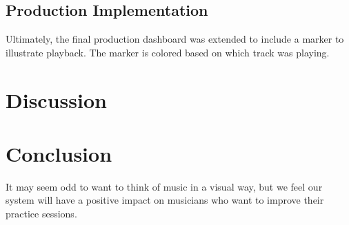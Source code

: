 \documentclass[journal]{vgtc}                %
\begin{document}
\subsection{Production Implementation}

Ultimately, the final production dashboard was extended to include a marker
to illustrate playback. The marker is colored based on which track was playing.

\section{Discussion}

\section{Conclusion}

It may seem odd to want to think of music in a visual way, but we feel our
system will have a positive impact on musicians who want to improve their
practice sessions.
\end{document}
